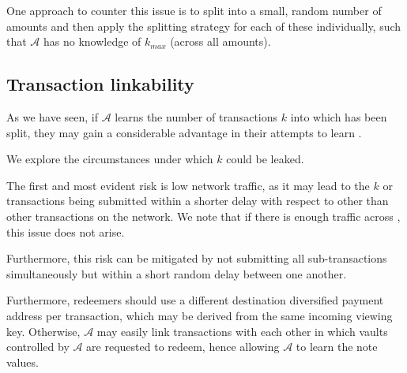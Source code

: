 One approach to counter this issue is to split \vtot into a small, random number of amounts and then apply the splitting strategy for each of these individually, such that $\mathcal{A}$ has no knowledge of $k_{max}$ (across all amounts).

\subsection{Transaction linkability}
\label{sec:linkability}

As we have seen, if $\mathcal{A}$ learns the number of transactions $k$ into which \vtot has been split, they may gain a considerable advantage in their attempts to learn \vtot.

We explore the circumstances under which $k$ could be leaked.

The first and most evident risk is low network traffic, as it may lead to the $k$ \lock or \burn transactions being submitted within a shorter delay with respect to other than other transactions on the network.
We note that if there is enough traffic across \zclaim, this issue does not arise.

Furthermore, this risk can be mitigated by not submitting all sub-transactions simultaneously but within a short random delay between one another.

Furthermore, redeemers should use a different destination diversified payment address \dpa per \burn transaction, which may be derived from the same incoming viewing key.
Otherwise, $\mathcal{A}$ may easily link \burn transactions with each other in which vaults controlled by $\mathcal{A}$ are requested to redeem, hence allowing $\mathcal{A}$ to learn the note values.




